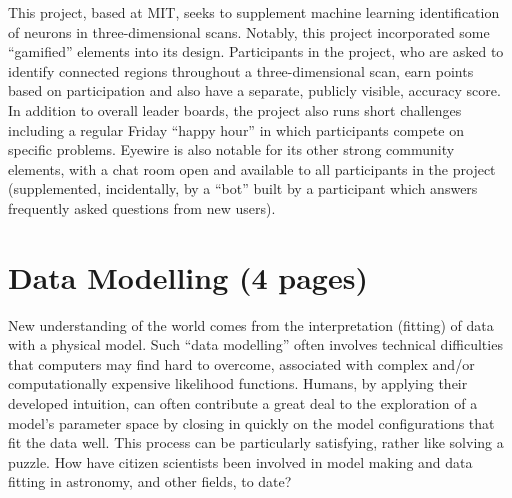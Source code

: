 \documentclass{ar2e}
\begin{document}
  This project,
based at MIT, seeks to supplement machine learning identification of neurons in
three-dimensional scans. Notably, this project incorporated some ``gamified''
elements into its design. Participants in the project, who are asked to identify
connected regions throughout a three-dimensional scan, earn points based on
participation and also have a separate, publicly visible, accuracy score.  In
addition to overall leader boards, the project also runs short challenges
including a regular Friday ``happy hour'' in which participants compete on
specific problems. Eyewire is also notable for its other strong community
elements, with a chat room open and available to all participants in the project
(supplemented, incidentally, by a ``bot'' built by a participant which answers
frequently asked questions from new users). 



\section{Data Modelling (4 pages)}
\label{sec:model}

New understanding of the world comes from the interpretation (fitting) of data
with a physical model. Such ``data modelling'' often involves technical
difficulties that computers may find hard to overcome, associated with complex
and/or computationally expensive likelihood functions. Humans, by applying their
developed intuition, can often contribute a great deal to the exploration of a
model's parameter space by closing in quickly on the model configurations that
fit the data well. This process can be particularly satisfying, rather like
solving a puzzle. How have citizen scientists been involved in model making and
data fitting in astronomy, and other fields, to date?
\end{document}
